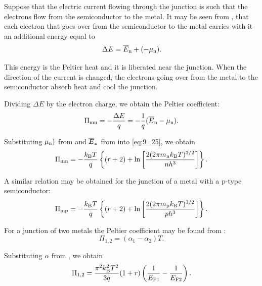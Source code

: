 Suppose that the electric current flowing through the junction is such that the electrons flow from the semiconductor to the metal. It may be seen from , that each electron that goes over from the semiconductor to the metal carries with it an additional energy equal to
\begin{equation}\label{eq:9_24}
    \Delta{E} = \overline{E}_{\text{n}} + (-\mu_{\text{n}}).
\end{equation}

\noindent
This energy is the Peltier heat and it is liberated near the junction. When the direction of the current is changed, the electrons going over from the metal to the semiconductor absorb heat and cool the junction.

Dividing $\Delta{E}$ by the electron charge, we obtain the Peltier coefficient:
\begin{equation}\label{eq:9_25}
    \Pi_{\text{mn}} = -\frac{\Delta{E}}{q} = -\frac{1}{q} (\overline{E}_{\text{n}} - \mu_{\text{n}}).
\end{equation}

\noindent
Substituting $\mu_{\text{n}})$ from  and $\overline{E}_{\text{n}}$ from  into \eqref{eq:9_25}, we obtain
\begin{equation}\label{eq:9_26}
    \Pi_{\text{mn}} = - \frac{k_{\text{B}}T}{q} \left\{  (r+2) + \ln\left[ \frac{2 (2 \pi m_{\text{n}} k_{\text{B}} T)^{3/2}}{nh^3} \right] \right\}.
\end{equation}

A similar relation may be obtained for the junction of a metal with a p-type semiconductor:
\begin{equation}\label{eq:9_27}
    \Pi_{\text{mp}} = - \frac{k_{\text{B}}T}{q} \left\{  (r+2) + \ln\left[ \frac{2 (2 \pi m_{\text{p}} k_{\text{B}} T)^{3/2}}{ph^3} \right] \right\}.
\end{equation}

For a junction of two metals the Peltier coefficient may be found from :
\vspace{-10pt}
\begin{equation}\label{eq:9_28}
    \Pi_{1,2} = (\alpha_1 - \alpha_2) T.
\end{equation}

\noindent
Substituting $\alpha$ from , we obtain
\begin{equation}\label{eq:9_29}
    \Pi_{1,2} = \frac{\pi^2 k_{\text{B}}^2 T^2}{3q} (1+r) \left( \frac{1}{E_{\text{F$1$}}} - \frac{1}{E_{\text{F$2$}}} \right).
\end{equation}

